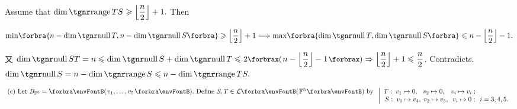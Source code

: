 Assume that $\dim\range TS\geqslant \left\lfloor\Frac{n}{2}\right\rfloor+1.$ Then\par\quad\Hb
$\min\!\Bra{n-\dim\null T,n-\dim\null S}\geqslant \left\lfloor\Frac{n}{2}\right\rfloor+1\Longrightarrow\max\!\Bra{\!\dim\null T,\dim\null S}\leqslant n-\left\lfloor\Frac{n}{2}\right\rfloor-1.$\par\vspace{2pt}\quad\Hb
又 $\dim\null ST=n\leqslant\dim\null S+\dim\null T\leqslant 2\XPar{n-\left\lfloor\Frac{n}{2}\right\rfloor-1}\Rightarrow \left\lfloor\Frac{n}{2}\right\rfloor+1\leqslant\Frac{n}{2}$. Contradicts.\PfEnd\vspace{10pt}\quad\Hb
\Or $\dim\null S=n-\dim\range S\leqslant n-\dim\range TS.$\par\vspace{-4pt}\quad\Hb
{}\PfEnd\vspace{6pt}\quad
\hspace{-2pt}$\hText{$(c) Let $B_{\Fbb^5}=\Par{v_1,\dots,v_5}.$ Define $S,T\in\Lm{\Fbb^5}$ by $\\\;}\MathLeftMid{l}{T: \; v_1\mapsto 0, \;\;\, v_2\mapsto 0, \;\;\; v_i\mapsto v_i\;;\\\,S: \; v_1\mapsto v_4, \; v_2\mapsto v_5, \;\; v_i\mapsto 0\;;\;\; i=3,4,5.}$\PfEnd
\SepLine

